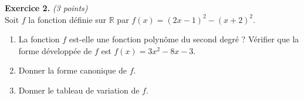 \documentclass[11pt]{article}
\begin{document}
\noindent\textbf{Exercice 2.} \hspace{.5cm}\emph{(3 points)}\\
Soit $f$ la fonction définie sur $\mathbb{R}$ par $f(x)=(2x-1)^2-(x+2)^2$.
\begin{enumerate}
  \item La fonction $f$ est-elle une fonction polynôme du second degré ?
    Vérifier que la forme développée de $f$ est $f(x) = 3x^2-8x-3$.
  \item Donner la forme canonique de $f$.
  \item Donner le tableau de variation de $f$.
\end{enumerate}
\end{document}
